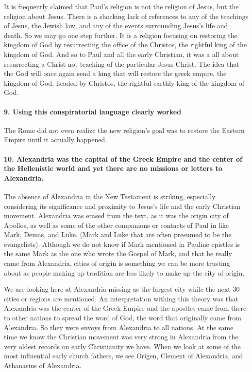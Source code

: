 It is frequently claimed that Paul's religion is not the religion of Jesus, but the religion about Jesus.
There is a shocking lack of references to any of the teachings of Jesus, the Jewish law, and any of the events surrounding Jesus's life and death.
So we may go one step further.
It is a religion focusing on restoring the kingdom of God by resurrecting the office of the Christos, the rightful king of the kingdom of God.
And so to Paul and all the early Christian, it was a all about resurrecting a Christ not teaching of the particular Jesus Christ.
The idea that the God will once again send a king that will restore the greek empire, the kingdom of God, headed by Christos, the rightful earthly king of the kingdom of God.

\paragraph{9.
Using this conspiratorial language clearly worked}\label{par:using-this-conspiratorial-language-clearly-worked}

The Rome did not even realize the new religion's goal was to restore the Eastern Empire until it actually happened.

\paragraph{10.
Alexandria was the capital of the Greek Empire and the center of the Hellenistic world and yet there are no missions or letters to Alexandria.}\label{par:alexandria-was-the-capital-of-the-greek-empire-and-the-center-of-the-hellenistic-world-and-yet-there-are-no-missions-or-letters-to-alexandria.}

The absence of Alexandria in the New Testament is striking, especially considering its significance and proximity to Jesus's life and the early Christian movement.
Alexandria was erased from the text, as it was the origin city of Apollos, as well as some of the other companions or contacts of Paul in like Mark, Demas, and Luke.
(Mark and Luke that are often presumed to be the evangelists).
Although we do not know if Mark mentioned in Pauline epistles is the same Mark as the one who wrote the Gospel of Mark, and that he really came from Alexandria, cities of origin is something we can be more trusting about as people making up tradition are less likely to make up the city of origin.

We are looking here at Alexandria missing as the largest city while the next 30 cities or regions are mentioned.
An interpretation withing this theory was that Alexandria was the center of the Greek Empire and the apostles came from there to other nations to spread the word of God, the word that originally came from Alexandria.
So they were envoys from Alexandria to all nations.
At the same time we know the Christian movement was very strong in Alexandria from the very oldest records on early Christianity we have.
When we look at some of the most influential early church fathers, we see Origen, Clement of Alexandria, and Athanasius of Alexandria.

